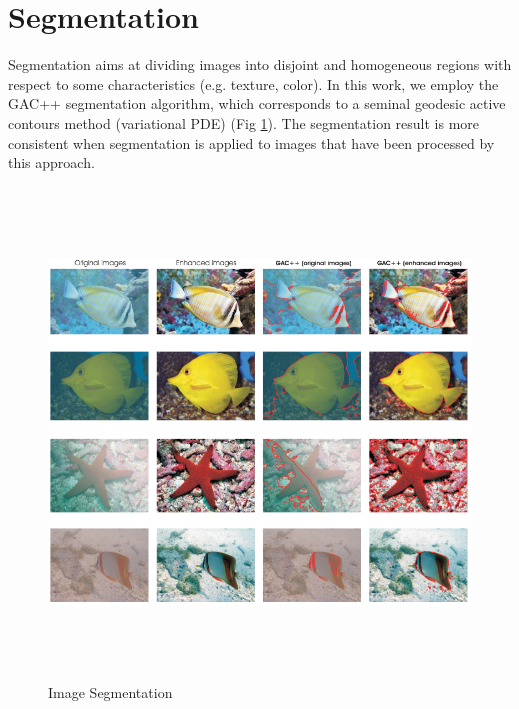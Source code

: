 \documentclass[hidelinks, 12pt]{report}
\begin{document}
\section{Segmentation}
Segmentation aims at dividing images into disjoint and homogeneous regions with respect to some characteristics (e.g. texture, color). In this work, we employ the GAC++ segmentation algorithm, which corresponds to a seminal geodesic active contours method (variational PDE) (Fig \ref{Segmentation}). The segmentation result is more consistent when segmentation is applied to images that have been processed by this approach.
\begin{figure}[H]
\centering
\includegraphics[width=15cm,height=13cm]{Segment.png}
\caption[Image Segmentation]{Image Segmentation}
\label{Segmentation}
\end{figure}
\end{document}
